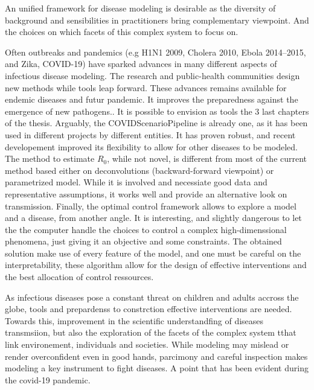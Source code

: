 An unified framework for disease modeling is desirable as the diversity of background and sensibilities in practitioners bring complementary viewpoint. And the choices on which facets of this complex system to focus on. 

Often outbreaks and pandemics (e.g H1N1 2009, Cholera 2010, Ebola 2014--2015, and Zika, COVID-19) have sparked advances in many different aspects of infectious disease modeling. The research and public-health communities design new methods while tools leap forward. These advances remains available for endemic diseases and futur pandemic. It improves the preparedness  against the emergence of new pathogens.. It is possible to envision as tools the 3 last chapters of the thesis. Arguably, the COVIDScenarioPipeline is already one, as it has been used in different projects by different entities. It has proven robust, and recent developement improved its flexibility to allow for other diseases to be modeled. The method to estimate $R_0$, while not novel, is different from most of the current method based either on deconvolutions (backward-forward viewpoint) or parametrized model. While it is involved and necessiate good data and representative assumptions, it works well and provide an alternative look on transmission.
Finally, the optimal control framework allows to explore a model and a disease, from another angle. It is interesting, and slightly dangerous to let the the computer handle the choices to control a complex high-dimenssional  phenomena, just giving it an objective and some constraints. The obtained solution make use of every feature of the model, and one must be careful on the interpretability, these algorithm allow for the design of effective interventions and the best allocation of control ressources. 

As infectious diseases pose a constant threat on children and adults accross the globe, tools and prepardenss to constrction effective interventions are needed. Towards this, improvement in the scientific understandfing of diseases transmsiion, but also the exploration of the facets of the complex system tthat link environement, individuals and societies. While modeling may mislead or render overconfident even in good hands, parcimony and careful inspection makes modeling a key instrument to fight diseases. A point that has been evident during the covid-19 pandemic.

